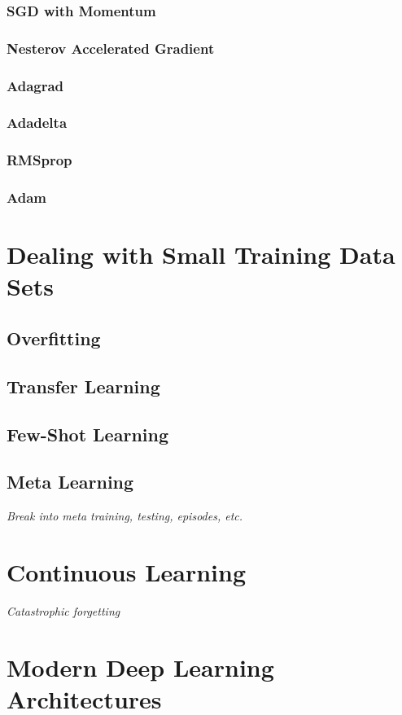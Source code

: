 \documentclass{report}
\begin{document}
	\subsubsection{SGD with Momentum}
	\subsubsection{Nesterov Accelerated Gradient}
	\subsubsection{Adagrad}
	\subsubsection{Adadelta}
	\subsubsection{RMSprop}
	\subsubsection{Adam}
	
	\section{Dealing with Small Training Data Sets}
	\subsection{Overfitting}
	\subsection{Transfer Learning}
	\subsection{Few-Shot Learning}
	\subsection{Meta Learning}
	\textit{Break into meta training, testing, episodes, etc.}
	\section{Continuous Learning}
	\textit{Catastrophic forgetting}
	\section{Modern Deep Learning Architectures}
\end{document}
